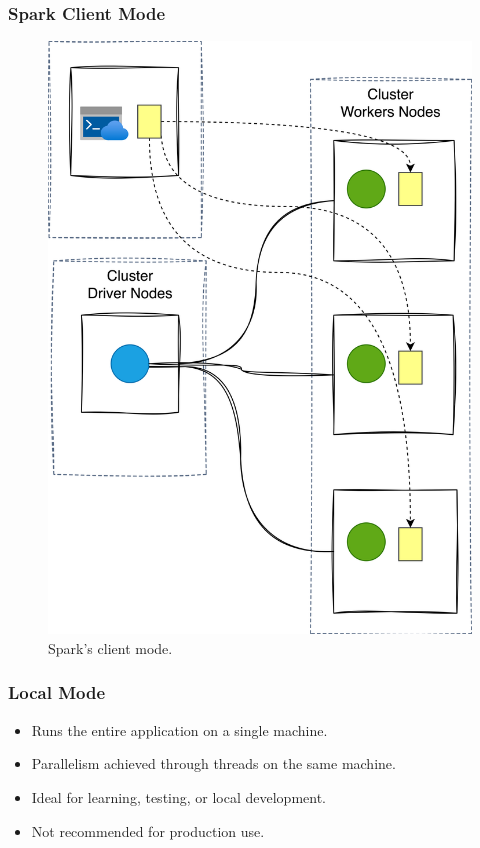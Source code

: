 %
\begin{frame}
    \frametitle{Spark Client Mode}
    \begin{figure}
        \includegraphics[width=\textwidth,height=.7\textheight,keepaspectratio]{./Figures/chapter-04/spark_client_mode}
        \caption{Spark’s client mode.}\label{fig:client_mode}
    \end{figure}
\end{frame}
%
\begin{frame}
    \frametitle{Local Mode}
    \begin{itemize}
        \item Runs the entire application on a single machine.
        \item Parallelism achieved through threads on the same machine.
        \item Ideal for learning, testing, or local development.
        \item Not recommended for production use.
    \end{itemize}
\end{frame}

